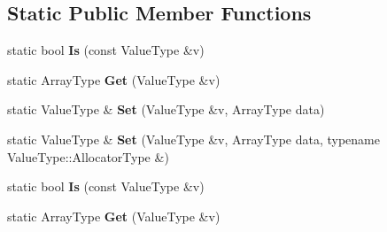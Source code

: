 \subsection*{Static Public Member Functions}
\begin{DoxyCompactItemize}
\item 
static bool {\bfseries Is} (const Value\+Type \&v)\hypertarget{structinternal_1_1_type_helper_3_01_value_type_00_01typename_01_value_type_1_1_array_01_4_a2a052fc0139112075f8bade42964273d}{}\label{structinternal_1_1_type_helper_3_01_value_type_00_01typename_01_value_type_1_1_array_01_4_a2a052fc0139112075f8bade42964273d}

\item 
static Array\+Type {\bfseries Get} (Value\+Type \&v)\hypertarget{structinternal_1_1_type_helper_3_01_value_type_00_01typename_01_value_type_1_1_array_01_4_a0e6bd47ab5da0387bf419cdf644035ab}{}\label{structinternal_1_1_type_helper_3_01_value_type_00_01typename_01_value_type_1_1_array_01_4_a0e6bd47ab5da0387bf419cdf644035ab}

\item 
static Value\+Type \& {\bfseries Set} (Value\+Type \&v, Array\+Type data)\hypertarget{structinternal_1_1_type_helper_3_01_value_type_00_01typename_01_value_type_1_1_array_01_4_a7bab3fa93fb8bda16baf289e1d281315}{}\label{structinternal_1_1_type_helper_3_01_value_type_00_01typename_01_value_type_1_1_array_01_4_a7bab3fa93fb8bda16baf289e1d281315}

\item 
static Value\+Type \& {\bfseries Set} (Value\+Type \&v, Array\+Type data, typename Value\+Type\+::\+Allocator\+Type \&)\hypertarget{structinternal_1_1_type_helper_3_01_value_type_00_01typename_01_value_type_1_1_array_01_4_adba46e8947dcfecaeca5a5a5d8bb36cc}{}\label{structinternal_1_1_type_helper_3_01_value_type_00_01typename_01_value_type_1_1_array_01_4_adba46e8947dcfecaeca5a5a5d8bb36cc}

\item 
static bool {\bfseries Is} (const Value\+Type \&v)\hypertarget{structinternal_1_1_type_helper_3_01_value_type_00_01typename_01_value_type_1_1_array_01_4_a2a052fc0139112075f8bade42964273d}{}\label{structinternal_1_1_type_helper_3_01_value_type_00_01typename_01_value_type_1_1_array_01_4_a2a052fc0139112075f8bade42964273d}

\item 
static Array\+Type {\bfseries Get} (Value\+Type \&v)\hypertarget{structinternal_1_1_type_helper_3_01_value_type_00_01typename_01_value_type_1_1_array_01_4_a0e6bd47ab5da0387bf419cdf644035ab}{}\label{structinternal_1_1_type_helper_3_01_value_type_00_01typename_01_value_type_1_1_array_01_4_a0e6bd47ab5da0387bf419cdf644035ab}


\end{DoxyCompactItemize}
